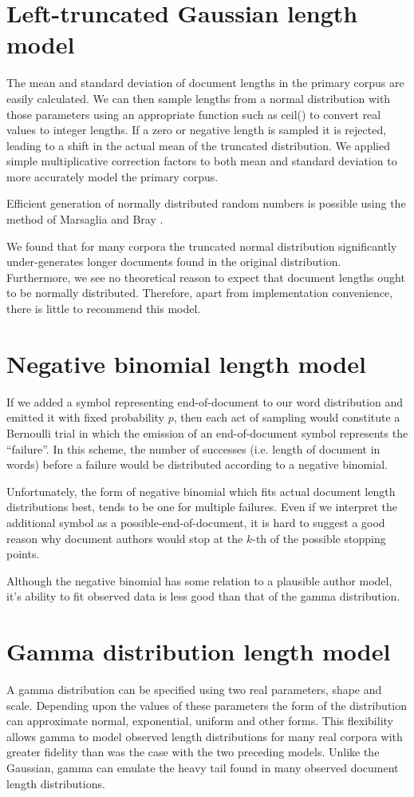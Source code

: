 \documentclass[11pt]{report}
\begin{document}
\section{Left-truncated Gaussian length model}
The mean and standard deviation of document lengths in the primary corpus are easily
calculated. We can then sample lengths from a normal distribution
with those parameters using an appropriate function such as ceil() to convert real
values to integer lengths.  If a zero or negative length is sampled
it is rejected, leading to a shift in the actual mean of the truncated
distribution. We applied simple multiplicative correction factors to
both mean and standard deviation to more accurately model the primary
corpus.

Efficient generation of normally distributed random numbers is 
possible using the method of Marsaglia and Bray \cite{Marsaglia1964}.

We found that for many corpora the truncated normal distribution significantly
under-generates longer documents found in the original distribution.
Furthermore, we see no theoretical reason to expect that document
lengths
ought to be normally distributed.  Therefore, apart from
implementation convenience, there is little to recommend this model.

\section{Negative binomial length model}
If we added a symbol representing end-of-document to our word
distribution and emitted it with fixed probability $p$, then each act
of sampling would constitute a Bernoulli trial in which the emission
of an end-of-document symbol represents the ``failure''.  In this
scheme, the number of successes (i.e. length of document in words)
before a failure would be distributed according to a negative
binomial.

Unfortunately, the form of negative binomial which fits actual
document length distributions best, tends to be one for multiple
failures.  Even if we interpret the additional symbol as a
possible-end-of-document, it is hard to suggest a good reason why
document authors would stop at the $k$-th of the possible
stopping points.

Although the negative binomial has some relation to a plausible author
model, it's ability to fit observed data is less good than that of the
gamma distribution.

\section{Gamma distribution length model}
A gamma distribution can be specified using two real parameters, shape
and scale.  Depending upon the values of these parameters the form of
the distribution can approximate normal, exponential, uniform and
other forms.  This flexibility allows gamma to model observed length
distributions for many real corpora with greater fidelity than was the
case with the two preceding models.  Unlike the Gaussian, gamma can
emulate the heavy tail found in many observed document length
distributions.
\end{document}
